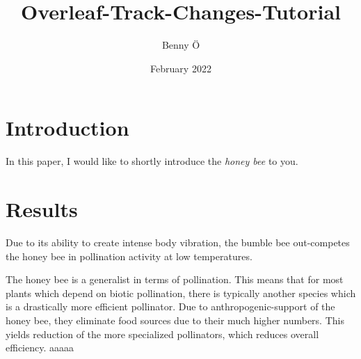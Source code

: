 \documentclass{article}
\title{Overleaf-Track-Changes-Tutorial}
\author{Benny Ö}
\date{February 2022}
\begin{document}
\maketitle

\section{Introduction}

In this paper, I would like to shortly introduce the \textit{honey bee} to you.

\section{Results}

Due to its ability to create intense body vibration, the bumble bee out-competes the honey bee in pollination activity at low temperatures.

The honey bee is a generalist in terms of pollination. This means that for most plants which depend on biotic pollination, there is typically another species which is a drastically more efficient pollinator. Due to anthropogenic-support of the honey bee, they eliminate food sources due to their much higher numbers. This yields reduction of the more specialized pollinators, which reduces overall efficiency.
aaaaa
\end{document}
